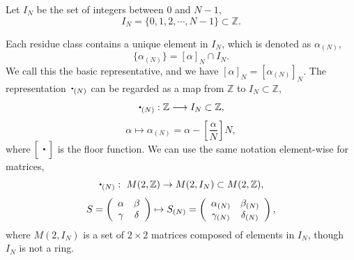 \documentclass[12pt]{iopart}
\newcommand{\sbt}{\,\begin{picture}(-1,1)(-1,-3)\circle*{2}\end{picture}\ }
\begin{document}
Let \(I_N\) be the set of integers between \(0\) and \(N-1\),
\begin{equation}
I_N=\{0,1,2,\cdots,N-1\}\subset\mathbb Z.
\end{equation}

Each residue class contains a unique element in \(I_N\),
which is denoted as \(\alpha_{(N)}\),
\begin{equation}
\{\alpha_{(N)}\}=[\alpha]_N\cap I_N.
\end{equation}
We call this the basic representative, and
we have \([\alpha]_N=[\alpha_{(N)}]_N\).
%
The representation \(\sbt_{(N)}\) can be regarded as a map from \(\mathbb Z\) to \(I_N\subset\mathbb Z\),
\begin{equation}
\sbt_{(N)}: \mathbb Z\longrightarrow I_N\subset\mathbb Z,
\end{equation}
\begin{equation}
\alpha\longmapsto\alpha_{(N)}=\alpha-\left[\frac\alpha N\right]N,
\end{equation}
where \(\displaystyle\left[\rule{0pt}{10pt}\ \sbt\ \right]\) is the floor function.
%
%
%
%
We can use the same notation element-wise for matrices,
\begin{equation}
\sbt_{(N)}:\ M(2,\mathbb Z)\rightarrow M(2,I_N)\subset M(2,\mathbb Z),
\end{equation}
\begin{equation}
S
=
\left(\begin{array}{cc}
\alpha & \beta \\
\gamma & \delta \\
\end{array}\right)
\mapsto S_{(N)}
=
\left(\begin{array}{cc}
\alpha_{(N)} & \beta_{(N)} \\\relax
\gamma_{(N)} & \delta_{(N)} \\
\end{array}\right),
\end{equation}
where \(M(2,I_N)\) is a set of \(2\times2\) matrices
composed of elements in \(I_N\), though \(I_N\) is not a ring.
\end{document}
